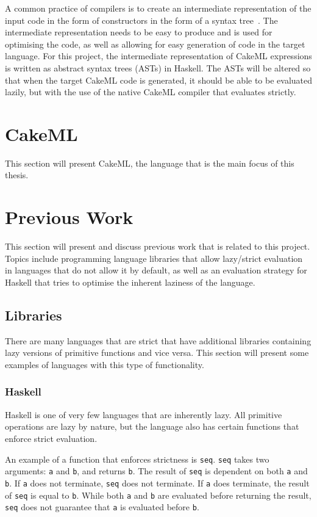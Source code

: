 A common practice of compilers is to create an intermediate representation of
the input code in the form of constructors in the form of a syntax
tree~\cite{DragonBook}. The intermediate representation needs to be
easy to produce and is used for optimising the code, as well as allowing for
easy generation of code in the target language.
For this project, the intermediate representation of CakeML expressions is %
written as abstract syntax trees (ASTs) in Haskell. The ASTs will be altered so
that when the target CakeML code is generated, it should be able to be evaluated
lazily, but with the use of the native CakeML compiler that evaluates strictly.

\section{CakeML}
\label{back:cakeml}
This section will present CakeML, the language that is the main focus of this
thesis. 

\section{Previous Work}
This section will present and discuss previous work that is related to this
project. Topics include programming language libraries that allow lazy/strict
evaluation in languages that do not allow it by default, as well as an
evaluation strategy for Haskell that tries to optimise the inherent laziness
of the language.

\subsection{Libraries}
There are many languages that are strict that have additional libraries
containing lazy versions of primitive functions and vice versa. This section
will present some examples of languages with this type of functionality.

\subsubsection{Haskell}
Haskell is one of very few languages that are inherently lazy. All primitive
operations are lazy by nature, but the language also has certain functions that
enforce strict evaluation.

An example of a function that enforces strictness is \texttt{seq}. \texttt{seq}
takes two arguments: \texttt{a} and \texttt{b}, and returns \texttt{b}. The
result of \texttt{seq} is dependent on both \texttt{a} and \texttt{b}. If
\texttt{a} does not terminate, \texttt{seq} does not terminate. If \texttt{a}
does terminate, the result of \texttt{seq} is equal to \texttt{b}. While both
\texttt{a} and \texttt{b} are evaluated before returning the result,
\texttt{seq} does not guarantee that \texttt{a} is evaluated before \texttt{b}.

